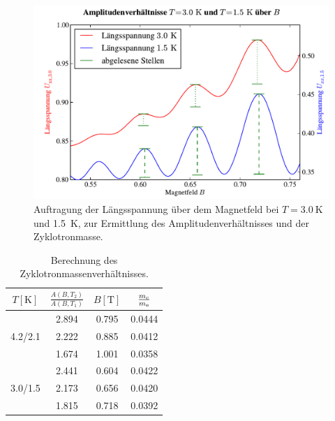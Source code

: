 \documentclass[paper=a4,fontsize=10pt,DIV=18,twocolumn,parskip=half]{scrartcl}
\numberwithin{equation}{section}    %
\newcommand{\kor}[1]{{\color{darkgreen}#1}}
\begin{document}
\begin{figure}[htp]
	\begin{center}
		\includegraphics[width=\columnwidth]{Data-Plots/13-3,0-1,5-zyklotron-B.pdf}
		\caption{Auftragung der Längsspannung über dem Magnetfeld bei $T=\SI{3.0}{\kelvin}$ und \SI{1.5}{\kelvin}, zur Ermittlung des Amplitudenverhältnisses und der Zyklotronmasse.}
		\label{fig:zyklotronmasse2}
	\end{center}
\end{figure}

\begin{table}[htp]
	\begin{center}
		\kor{\begin{tabular}{c|ccc}
			\hline
			$T[\mathrm{K}]$ & $\frac{A(B,T_2)}{A(B,T_1)}$ & $B[\mathrm{T}]$ & $\frac{m_{\rm c}}{m_{\rm e}}$\\
			\hline
			 		& 2.894 & 0.795 & 0.0444 \\
			4.2/2.1 & 2.222 & 0.885 & 0.0412 \\
			 		& 1.674 & 1.001 & 0.0358 \\
			\hline
					& 2.441 & 0.604 & 0.0422 \\
			3.0/1.5 & 2.173 & 0.656 & 0.0420 \\
					& 1.815 & 0.718 & 0.0392 \\

					
		\end{tabular}}
		\caption{Berechnung des Zyklotronmassenverhältnisses.}
		\label{tab:zyklotronmasse}
	\end{center}
\end{table}
\end{document}
